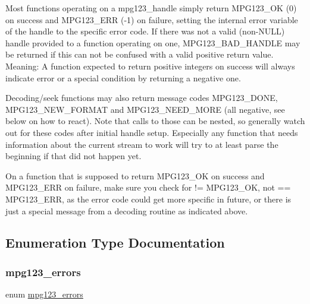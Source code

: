 Most functions operating on a mpg123\+\_\+handle simply return M\+P\+G123\+\_\+\+OK (0) on success and M\+P\+G123\+\_\+\+E\+RR (-\/1) on failure, setting the internal error variable of the handle to the specific error code. If there was not a valid (non-\/\+N\+U\+LL) handle provided to a function operating on one, M\+P\+G123\+\_\+\+B\+A\+D\+\_\+\+H\+A\+N\+D\+LE may be returned if this can not be confused with a valid positive return value. Meaning\+: A function expected to return positive integers on success will always indicate error or a special condition by returning a negative one.

Decoding/seek functions may also return message codes M\+P\+G123\+\_\+\+D\+O\+NE, M\+P\+G123\+\_\+\+N\+E\+W\+\_\+\+F\+O\+R\+M\+AT and M\+P\+G123\+\_\+\+N\+E\+E\+D\+\_\+\+M\+O\+RE (all negative, see below on how to react). Note that calls to those can be nested, so generally watch out for these codes after initial handle setup. Especially any function that needs information about the current stream to work will try to at least parse the beginning if that did not happen yet.

On a function that is supposed to return M\+P\+G123\+\_\+\+OK on success and M\+P\+G123\+\_\+\+E\+RR on failure, make sure you check for != M\+P\+G123\+\_\+\+OK, not == M\+P\+G123\+\_\+\+E\+RR, as the error code could get more specific in future, or there is just a special message from a decoding routine as indicated above. 

\subsection{Enumeration Type Documentation}
\mbox{\label{group__mpg123__error_gac50432012aeaf7c23014de3198dfa5fd}} 
\subsubsection{\texorpdfstring{mpg123\_errors}{mpg123\_errors}}
{\footnotesize\ttfamily enum \mbox{\hyperlink{group__mpg123__error_gac50432012aeaf7c23014de3198dfa5fd}{mpg123\+\_\+errors}}}


